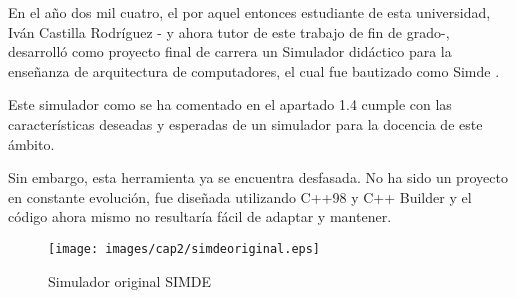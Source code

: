 En el año dos mil cuatro, el por aquel entonces estudiante de esta universidad, 
Iván Castilla Rodríguez - y ahora tutor de este trabajo de fin de grado-, 
desarrolló como proyecto final de carrera un Simulador didáctico para la enseñanza 
de arquitectura de computadores, el cual fue bautizado como Simde \cite{SIMDE}. 

\bigskip
Este simulador como se ha comentado en el apartado 1.4 cumple con las características
deseadas y esperadas de un simulador para la docencia de este ámbito.

\bigskip
Sin embargo, esta herramienta ya se encuentra desfasada. No ha sido un proyecto en constante
evolución, fue diseñada utilizando C++98 y C++ Builder y el código ahora mismo no resultaría
fácil de adaptar y mantener.

\begin{figure}[!th]
\begin{center}
\texttt{[image: images/cap2/simdeoriginal.eps]}
\caption{Simulador original SIMDE}
\label{fig:Simulador original SIMDE}
\end{center}
\end{figure}